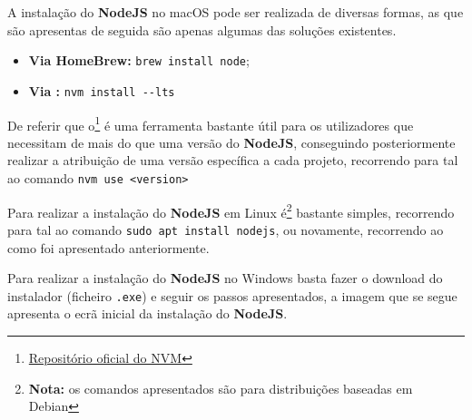 \label{nodeAttachments}



A instalação do \textbf{NodeJS} no macOS pode ser realizada de diversas formas, as que são apresentas de seguida são apenas algumas das soluções existentes.

\begin{itemize}
	\item \textbf{Via HomeBrew:} \verb|brew install node|;
	\item \textbf{Via :} \verb|nvm install --lts|
\end{itemize}

De referir que o\textbf{}\footnote{\href{https://github.com/nvm-sh/nvm}{Repositório oficial do NVM}} é uma ferramenta bastante útil para os utilizadores que necessitam de mais do que uma versão do \textbf{NodeJS}, conseguindo posteriormente realizar a atribuição de uma versão específica a cada projeto, recorrendo para tal ao comando \verb|nvm use <version>|


Para realizar a instalação do \textbf{NodeJS} em Linux é\footnote{\textbf{Nota:} os comandos apresentados são para distribuições baseadas em Debian} bastante simples, recorrendo para tal ao comando \verb|sudo apt install nodejs|, ou novamente, recorrendo ao \textbf{} como foi apresentado anteriormente.



Para realizar a instalação do \textbf{NodeJS} no Windows basta fazer o download do instalador (ficheiro \verb|.exe|) e seguir os passos apresentados, a imagem que se segue apresenta o ecrã inicial da instalação do \textbf{NodeJS}.


\label{nodeArch}

